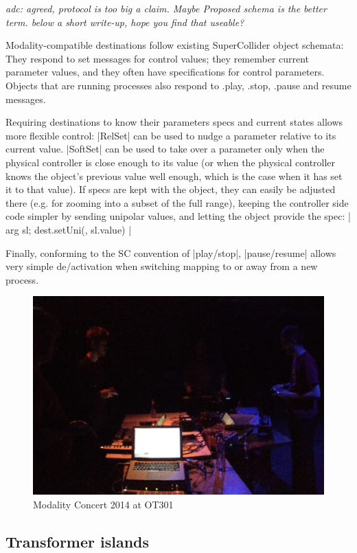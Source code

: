 \documentclass{article}
\begin{document}
\emph{adc: agreed, protocol is too big a claim. Maybe Proposed schema is the better term. below a short write-up, hope you find that useable?}

Modality-compatible destinations follow existing SuperCollider object schemata: They respond to set messages for control values; they remember current parameter values, and they often have specifications for control parameters. Objects that are running processes also respond to .play, .stop, .pause and resume messages. 

Requiring destinations to know their parameters specs and current states allows more flexible control: 
|RelSet| can be used to nudge a parameter relative to its current value. 
|SoftSet| can be used to take over a parameter only when the physical controller is close enough to its value (or when the physical controller knows the object's previous value well enough, which is the case when it has set it to that value). 
If specs are kept with the object, they can easily be adjusted there (e.g. for zooming into a subset of the full range), keeping the controller side code simpler by sending unipolar values, and letting the object provide the spec:  
|{ arg sl; dest.setUni(\freq, sl.value) }|

Finally, conforming to the SC convention of |play/stop|, |pause/resume| allows very simple de/activation when switching mapping to or away from a new process. 

\begin{figure}[h]
	\centering
		\includegraphics[width=.9\columnwidth]{../media/20140405-IMG_1691.jpg}
	\caption{Modality Concert 2014 at OT301}
	\label{fig:media_20140405-IMG_1691}
\end{figure}

\subsection{Transformer islands} 
\end{document}
